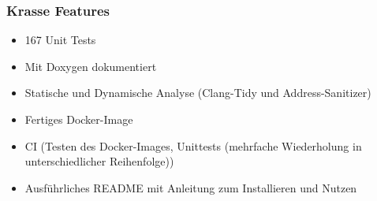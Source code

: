 \documentclass[aspectratio=169]{beamer}
\begin{document}
\begin{frame}
    \frametitle{Krasse Features}
    \begin{itemize}
        \item 167 Unit Tests %
            \pause
        \item Mit Doxygen dokumentiert
            \pause
        \item Statische und Dynamische Analyse (Clang-Tidy und Address-Sanitizer)
            \pause
        \item Fertiges Docker-Image
            \pause
        \item CI (Testen des Docker-Images, Unittests (mehrfache Wiederholung in unterschiedlicher Reihenfolge))
            \pause
        \item Ausführliches README mit Anleitung zum Installieren und Nutzen
    \end{itemize}
\end{frame}
\end{document}
